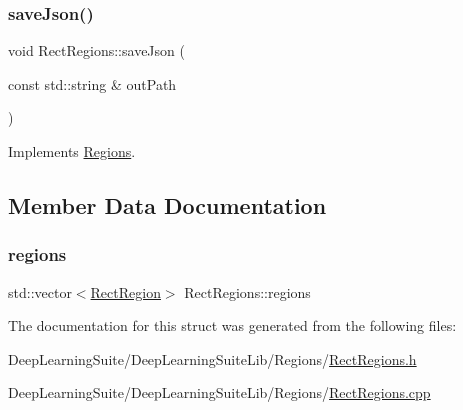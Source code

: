 \mbox{\label{struct_rect_regions_a84d6d3a2e3ee8faf775c69fcd3207767}} 
\subsubsection{\texorpdfstring{save\+Json()}{saveJson()}}
{\footnotesize\ttfamily void Rect\+Regions\+::save\+Json (\begin{DoxyParamCaption}\item[{const std\+::string \&}]{out\+Path }\end{DoxyParamCaption})\hspace{0.3cm}{\ttfamily [virtual]}}



Implements \hyperlink{struct_regions_a402078d4ff67e4aee31b231c2d1942c6}{Regions}.



\subsection{Member Data Documentation}
\mbox{\label{struct_rect_regions_a213237dc4a98b5d77d76c3992d533694}} 
\subsubsection{\texorpdfstring{regions}{regions}}
{\footnotesize\ttfamily std\+::vector$<$\hyperlink{struct_rect_region}{Rect\+Region}$>$ Rect\+Regions\+::regions}



The documentation for this struct was generated from the following files\+:\begin{DoxyCompactItemize}
\item 
Deep\+Learning\+Suite/\+Deep\+Learning\+Suite\+Lib/\+Regions/\hyperlink{_rect_regions_8h}{Rect\+Regions.\+h}\item 
Deep\+Learning\+Suite/\+Deep\+Learning\+Suite\+Lib/\+Regions/\hyperlink{_rect_regions_8cpp}{Rect\+Regions.\+cpp}\end{DoxyCompactItemize}
